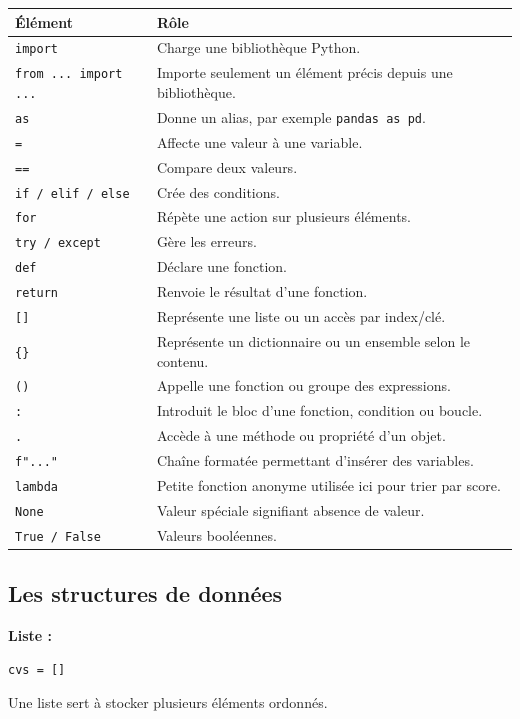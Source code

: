 \documentclass[12pt,a4paper]{article}
\begin{document}
\begin{longtable}{|p{3cm}|p{10.8cm}|}
\hline
\textbf{Élément} & \textbf{Rôle} \\
\hline
\texttt{import} & Charge une bibliothèque Python. \\
\hline
\texttt{from ... import ...} & Importe seulement un élément précis depuis une bibliothèque. \\
\hline
\texttt{as} & Donne un alias, par exemple \texttt{pandas as pd}. \\
\hline
\texttt{=} & Affecte une valeur à une variable. \\
\hline
\texttt{==} & Compare deux valeurs. \\
\hline
\texttt{if / elif / else} & Crée des conditions. \\
\hline
\texttt{for} & Répète une action sur plusieurs éléments. \\
\hline
\texttt{try / except} & Gère les erreurs. \\
\hline
\texttt{def} & Déclare une fonction. \\
\hline
\texttt{return} & Renvoie le résultat d'une fonction. \\
\hline
\texttt{[]} & Représente une liste ou un accès par index/clé. \\
\hline
\texttt{\{\}} & Représente un dictionnaire ou un ensemble selon le contenu. \\
\hline
\texttt{()} & Appelle une fonction ou groupe des expressions. \\
\hline
\texttt{:} & Introduit le bloc d'une fonction, condition ou boucle. \\
\hline
\texttt{.} & Accède à une méthode ou propriété d'un objet. \\
\hline
\texttt{f"..."} & Chaîne formatée permettant d'insérer des variables. \\
\hline
\texttt{lambda} & Petite fonction anonyme utilisée ici pour trier par score. \\
\hline
\texttt{None} & Valeur spéciale signifiant absence de valeur. \\
\hline
\texttt{True / False} & Valeurs booléennes. \\
\hline
\end{longtable}

\subsection{Les structures de données}

\textbf{Liste :}
\begin{lstlisting}[style=pythonstyle]
cvs = []
\end{lstlisting}
Une liste sert à stocker plusieurs éléments ordonnés.
\end{document}
